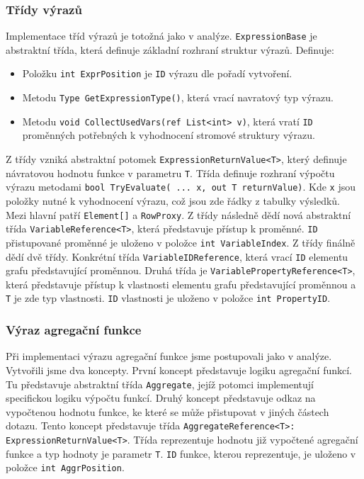 \subsubsection{Třídy výrazů}

Implementace tříd výrazů je totožná jako v analýze.
\texttt{ExpressionBase} je abstraktní třída, která definuje základní rozhraní struktur výrazů.
Definuje:
\begin{itemize}
\item Položku \texttt{int ExprPosition} je \texttt{ID} výrazu dle pořadí vytvoření.
\item Metodu \texttt{Type GetExpressionType()}, která vrací navratový typ výrazu.
\item Metodu \texttt{void CollectUsedVars(ref List<int> v)}, která vratí \texttt{ID} proměnných potřebných k vyhodnocení stromové struktury výrazu.
\end{itemize}
Z třídy vzniká abstraktní potomek \texttt{ExpressionReturnValue<T>}, který definuje návratovou hodnotu funkce v parametru \texttt{T}.
Třída definuje rozhraní výpočtu výrazu metodami \texttt{bool TryEvaluate( ... x, out T returnValue)}.
Kde \texttt{x} jsou položky nutné k vyhodnocení výrazu, což jsou zde řádky z tabulky výsledků.
Mezi hlavní patří \texttt{Element[]} a \texttt{RowProxy}.
Z třídy následně dědí nová abstraktní třída \texttt{VariableReference<T>}, která představuje přístup k proměnné.
\texttt{ID} přistupované proměnné je uloženo v položce \texttt{int VariableIndex}.
Z třídy finálně dědí dvě třídy.
Konkrétní třída \texttt{VariableIDReference}, která vrací \texttt{ID} elementu grafu představující proměnnou.
Druhá třída je \texttt{VariablePropertyReference<T>}, která představuje přístup k vlastnosti elementu grafu představující proměnnou a \texttt{T} je zde typ vlastnosti.
\texttt{ID} vlastnosti je uloženo v položce \texttt{int PropertyID}. 

\subsubsection{Výraz agregační funkce}

Při implementaci výrazu agregační funkce jsme postupovali jako v analýze.
Vytvořili jsme dva koncepty.
První koncept představuje logiku agregační funkcí.
Tu představuje abstraktní třída \texttt{Aggregate}, jejíž potomci implementují specifickou logiku výpočtu funkcí. 
Druhý koncept představuje odkaz na vypočtenou hodnotu funkce, ke které se může přistupovat v jiných částech dotazu.
Tento koncept představuje třída \texttt{AggregateReference<T>: ExpressionReturnValue<T>}.
Třída reprezentuje hodnotu již vypočtené agregační funkce a typ hodnoty je parametr \texttt{T}.
\texttt{ID} funkce, kterou reprezentuje, je uloženo v položce \texttt{int AggrPosition}.

